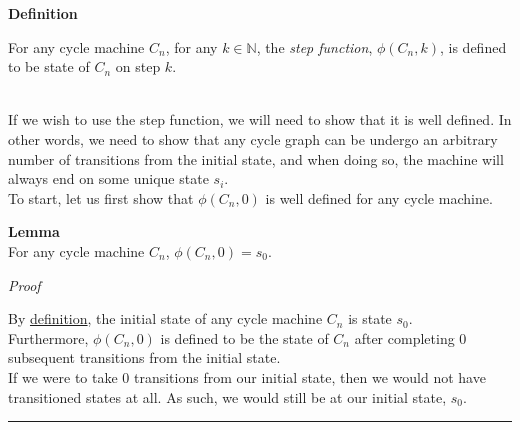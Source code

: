 \documentclass[a4paper,12pt]{article}
\begin{document}
\label{definition:cycle_step_function}
\hypertarget{definition:cycle_step_function}{}
\begin{tcolorbox}
\textbf{Definition}

\noindent For any cycle machine $C_n$, for any $k \in \mathbb{N}$, the \textit{step function}, $\phi(C_n, k)$, is defined to be state of $C_n$ on step $k$.
\end{tcolorbox}



\noindent \\
If we wish to use the step function, we will need to show that it is well defined. In other words, we need to show that any cycle graph can be undergo an arbitrary number of transitions from the initial state, and when doing so, the machine will always end on some unique state $s_i$.\\

\noindent To start, let us first show that $\phi(C_n, 0)$ is well defined for any cycle machine.\\







\label{lemma:phi_of_0}
\hypertarget{lemma:phi_of_0}{}
\begin{tcolorbox}
\textbf{Lemma}\\
For any cycle machine $C_n$, $\phi(C_n, 0) = s_0$.
\end{tcolorbox}

\noindent
\textit{Proof}

\noindent By \hyperlink{definition:cycle_machine}{definition}, the initial state of any cycle machine $C_n$ is state $s_0$.\\

\noindent Furthermore, $\phi(C_n, 0)$ is defined to be the state of $C_n$ after completing $0$ subsequent transitions from the initial state.\\

\noindent If we were to take $0$ transitions from our initial state, then we would not have transitioned states at all. As such, we would still be at our initial state, $s_0$.

\begin{center}
\noindent\rule{8cm}{0.4pt}
\end{center}
\end{document}
